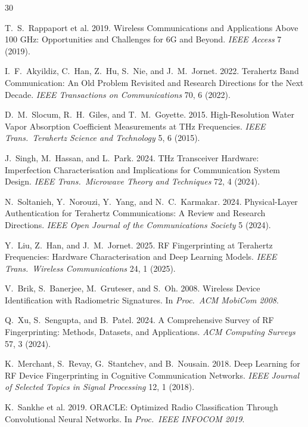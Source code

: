 \documentclass[sigconf,nonacm]{acmart}
\begin{document}
\sloppy

\begin{thebibliography}{30}

T.~S.~Rappaport et al. 2019. Wireless Communications and
Applications Above 100 GHz: Opportunities and Challenges for 6G
and Beyond. \textit{IEEE Access} 7 (2019).

I.~F.~Akyildiz, C.~Han, Z.~Hu, S.~Nie, and J.~M.~Jornet. 2022.
Terahertz Band Communication: An Old Problem Revisited and
Research Directions for the Next Decade. \textit{IEEE Transactions
on Communications} 70, 6 (2022).

D.~M.~Slocum, R.~H.~Giles, and T.~M.~Goyette. 2015. High-Resolution
Water Vapor Absorption Coefficient Measurements at THz Frequencies.
\textit{IEEE Trans.\ Terahertz Science and Technology} 5, 6 (2015).

J.~Singh, M.~Hassan, and L.~Park. 2024. THz Transceiver Hardware:
Imperfection Characterisation and Implications for Communication
System Design. \textit{IEEE Trans.\ Microwave Theory and Techniques}
72, 4 (2024).

N.~Soltanieh, Y.~Norouzi, Y.~Yang, and N.~C.~Karmakar. 2024.
Physical-Layer Authentication for Terahertz Communications:
A Review and Research Directions.
\textit{IEEE Open Journal of the Communications Society} 5 (2024).

Y.~Liu, Z.~Han, and J.~M.~Jornet. 2025. RF Fingerprinting at
Terahertz Frequencies: Hardware Characterisation and Deep Learning
Models. \textit{IEEE Trans.\ Wireless Communications} 24, 1 (2025).

V.~Brik, S.~Banerjee, M.~Gruteser, and S.~Oh. 2008. Wireless
Device Identification with Radiometric Signatures.
In \textit{Proc.\ ACM MobiCom 2008}.

Q.~Xu, S.~Sengupta, and B.~Patel. 2024. A Comprehensive Survey of
RF Fingerprinting: Methods, Datasets, and Applications.
\textit{ACM Computing Surveys} 57, 3 (2024).

K.~Merchant, S.~Revay, G.~Stantchev, and B.~Nousain. 2018. Deep
Learning for RF Device Fingerprinting in Cognitive Communication
Networks. \textit{IEEE Journal of Selected Topics in Signal
Processing} 12, 1 (2018).

K.~Sankhe et al. 2019. ORACLE: Optimized Radio Classification
Through Convolutional Neural Networks. In \textit{Proc.\ IEEE
INFOCOM 2019}.


\end{thebibliography}
\end{document}

